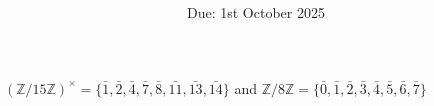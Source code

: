 \documentclass[12pt]{article}
\title{\textbf{\mytitle}}
\author{\textbf{\myauthor}}
\date{Due: 1st October 2025}
\begin{document}
\onehalfspacing
\maketitle

\section{} %
\subsection{} %
$(\mathbb{Z}/15\mathbb{Z})^{\times}=\{\bar{1},\bar{2},\bar{4},\bar{7},\bar{8},\bar{11},\bar{13},\bar{14}\}$ and $\mathbb{Z}/8\mathbb{Z}=\{\bar{0},\bar{1},\bar{2},\bar{3},\bar{4},\bar{5},\bar{6},\bar{7}\}$
\subsection{} %
\subsection{} %
\subsection{} %
\subsection{} %
\subsection{} %
\subsection{} %
\subsection{} %

\newpage
\section{} %

\newpage
\section{} %
\subsection{}
\end{document}
